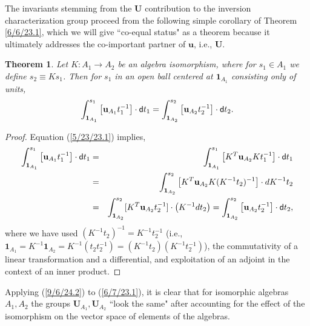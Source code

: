 \documentclass{amsart}
\numberwithin{equation}{section}
\newtheorem{theorem}{Theorem}
\theoremstyle{definition}
\numberwithin{theorem}{section}
\begin{document}
The invariants stemming from the $\mathbf{U}$ contribution to the inversion characterization group proceed from the following simple corollary of Theorem \ref{6/6/23.1}, which we will give ``co-equal status" as a theorem because it ultimately addresses the co-important  partner of $\mathbf{u}$, i.e., $\mathbf{U}$. 

\begin{theorem}\label{6/6/23.2} Let $K:A_1\rightarrow A_2$ be an algebra isomorphism, where for $s_1\in A_1$ we define $s_2\equiv Ks_1$.  Then for $s_1$ in an open ball centered at $\mathbf{1}_{A_1}$ consisting only of units, \begin{equation}\label{9/6/24.2} \int_{{\bf 1}_{A_1}}^{s_1} \left[\mathbf{u}_{A_1}t_1^{-1}\right]\cdot {\sf d}t_1 
= \int_{{\bf 1}_{A_2}}^{s_2} \left[\mathbf{u}_{A_2}t_2^{-1}\right]\cdot {\sf d}t_2 . \end{equation} \end{theorem}

\begin{proof} 
Equation (\ref{5/23/23.1}) implies,
\begin{eqnarray*} \int_{{\bf 1}_{A_1}}^{s_1} \left[\mathbf{u}_{A_1}t_1^{-1}\right]\cdot {\sf d}t_1 &=& \int_{{\bf 1}_{A_1}}^{s_1} \left[ K^T\mathbf{u}_{A_2}Kt_1^{-1}\right]\cdot {\sf d}t_1 \\ &=& 
\int_{{\bf 1}_{A_2}}^{s_2} \left[ K^T\mathbf{u}_{A_2}K (K^{-1}t_2)^{-1}\right]\cdot dK^{-1}t_2 \\ &=& \int_{{\bf 1}_{A_2}}^{s_2} [K^T\mathbf{u}_{A_2}t_2^{-1}]\cdot \left(K^{-1}dt_2\right) = \int_{{\bf 1}_{A_2}}^{s_2} \left[\mathbf{u}_{A_2}t_2^{-1}\right]\cdot {\sf d}t_2, 
\end{eqnarray*} 
where we have used $(K^{-1}t_2)^{-1} = K^{-1}t_2^{-1}$ (i.e., $\mathbf{1}_{A_1} = K^{-1}\mathbf{1}_{A_2} = K^{-1}(t_2t_2^{-1}) = (K^{-1}t_2)(K^{-1}t_2^{-1})$), the commutativity of a linear transformation and a differential, and exploitation of an adjoint in the context of an inner product.
\end{proof}



Applying (\ref{9/6/24.2}) to (\ref{6/7/23.1}), it is clear that for isomorphic algebras $A_1,A_2$ the groups $\mathbf{U}_{A_1},  \mathbf{U}_{A_2}$ ``look the same" after accounting for the effect of the isomorphism on the vector space of elements of the algebras.
\end{document}
